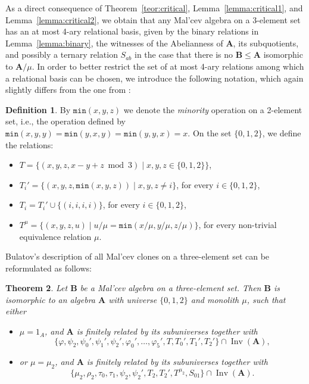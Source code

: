 \documentclass[12pt]{amsart}
\newtheorem{theorem}{Theorem}[section]
\theoremstyle{definition}
\theoremstyle{definition}
\newtheorem{definition}[theorem]{Definition}
\newcommand{\alg}[1]{\mathbf{#1}}
\newcommand{\algA}{\alg{A}}
\newcommand{\algB}{\alg{B}}
\DeclareMathOperator{\Inv}{Inv}
\newcommand{\minority}{\mathtt{min}}
\begin{document}
As a direct consequence of Theorem~\ref{teor:critical}, Lemma~\ref{lemma:critical1}, 
and Lemma~\ref{lemma:critical2}, we obtain that any Mal'cev algebra on a 3-element set 
has an at most 4-ary relational basis, given by the binary relations in Lemma~\ref{lemma:binary}, 
the witnesses of the Abelianness of $\algA$, its subquotients, and possibly a ternary relation $S_{ab}$ 
in the case that there is no $\alg{B}\leq\alg{A}$ isomorphic to $\algA/\mu$. 
In order to better restrict the set of at most 4-ary relations among which a relational basis can be chosen, we introduce the following notation, 
which again slightly differs from the one from \cite{BulatovImportante}:


\begin{definition}
By $\minority(x,y,z)$ we denote the \emph{minority} operation on a 2-element set, i.e., the operation defined by $\minority(x,y,y) = \minority(y,x,y) = \minority(y,y,x) = x$. On the set $\{0,1,2\}$, we define the relations:
\begin{itemize}
\item $T = \{(x,y,z, x-y+z \bmod 3) \mid x,y,z \in \{0,1,2\} \}$,
\item $T_{i}' = \{(x,y,z,\minority(x,y,z)) \mid x,y,z \neq i \}$, for every $i\in \{0,1,2\}$,
\item $T_{i} = T_i' \cup \{(i,i,i,i)\}$, for every $i\in \{0,1,2\}$,
\item $T^{\mu} = \{(x,y,z,u) \mid u/{\mu} = \minority(x/{\mu},y/{\mu},z/{\mu}) \}$, for every non-trivial equivalence relation $\mu$.
\end{itemize}
\end{definition}

Bulatov's description of all Mal'cev clones on a three-element set can be reformulated as follows:

\begin{theorem} \label{thm:bulatovreproved}
Let $\algB$ be a Mal'cev algebra on a three-element set. Then $\algB$ is isomorphic to an algebra $\algA$ with universe $\{0,1,2\}$ and monolith $\mu$, such that either
\begin{itemize}
\item $\mu = 1_A$, and $\algA$ is finitely related by its subuniverses together with
\begin{equation}\label{eq:standardrel}\{\varphi, \psi_2, \psi_0', \psi_1', \psi_2', \varphi_0', \ldots, \varphi_5', T,T_0',T_1',T_2'\}\cap \Inv(\algA), \end{equation}
\item or $\mu = \mu_2$, and $\algA$ is finitely related by its subuniverses together with
\begin{equation}\label{eq:standardrel2}\{\mu_2, \rho_2, \tau_0,\tau_1, \psi_2, \psi_2' ,T_2,T_2',T^{\mu_2}, S_{01} \} \cap \Inv(\algA). \end{equation}
\end{itemize}
\end{theorem}
\end{document}
